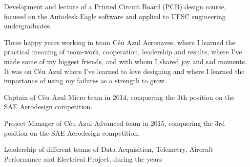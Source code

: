 \documentclass[A4]{deedy-resume} %
\begin{document}
\hfill
\begin{minipage}[t]{0.67\textwidth} %

\vspace{\topsep} %

\vspace{\topsep} %
\begin{tightitemize}
\item Development and lecture of a Printed Circuit Board (PCB) design course, focused on the Autodesk Eagle software and applied to UFSC engineering undergraduates. 
\end{tightitemize}
\sectionspace %

\vspace{\topsep} %
\begin{tightitemize}
\item Three happy years working in team Céu Azul Aeronaves, where I learned the practical meaning of team-work, cooperation, leadership and results, where I've made some of my biggest friends, and with whom I shared joy and sad moments. It was on Céu Azul where I've learned to love designing and where I learned the importance of using my failures as a strength to grow.
\newline{}
\begin{tightitemize}
\item Captain of Céu Azul Micro team in 2014, conquering the 3th position on the SAE Aerodesign competition.
\item Project Manager of Céu Azul Advanced team in 2015, conquering the 3rd position on the SAE Aerodesign competition.
\item Leadership of different teams of Data Acquisition, Telemetry, Aircraft Performance and Electrical Project, during the years
\end{tightitemize}

\end{tightitemize}
\sectionspace %




\end{minipage}
\end{document}
